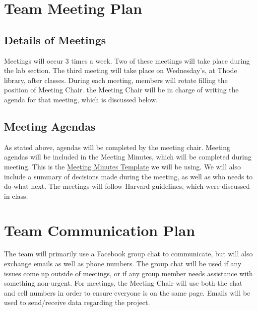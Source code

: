 \documentclass[12pt]{article}
\begin{document}
\section{Team Meeting Plan}
\subsection{Details of Meetings}
Meetings will occur 3 times a week. Two of these meetings will take place during the lab section. The third meeting will take place on Wednesday's, at Thode library, after classes. During each meeting, members will rotate filling the position of Meeting Chair. the Meeting Chair will be in charge of writing the agenda for that meeting, which is discussed below.

\subsection{Meeting Agendas}
As stated above, agendas will be completed by the meeting chair. Meeting agendas will be included in the Meeting Minutes, which will be completed during meeting. This is the \href{run:./docs/MeetingMinutesTemplates.pdf}{Meeting Minutes Template} we will be using. We will also include a summary of decisions made during the meeting, as well as who needs to do what next. The meetings will follow Harvard guidelines, which were discussed in class.

\section{Team Communication Plan}
The team will primarily use a Facebook group chat to communicate, but will also exchange emails as well as phone numbers.
The group chat will be used if any issues come up outside of meetings, or if any group member needs assistance with something non-urgent. For meetings, the Meeting Chair will use both the chat and cell numbers in order to ensure everyone is on the same page. Emails will be used to send/receive data regarding the project.

\newpage
\end{document}
